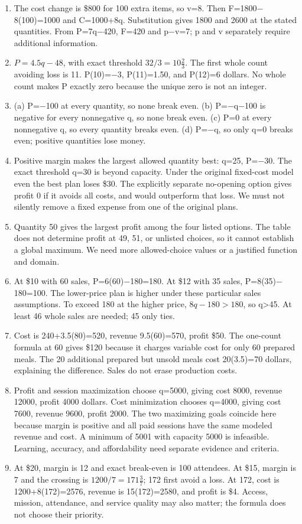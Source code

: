 \documentclass[11pt,letterpaper]{article}
\begin{document}
{\begin{enumerate}
\item The cost change is \$800 for 100 extra items, so v=8. Then F=1800\ensuremath{-}8(100)=1000 and C=1000+8q. Substitution gives 1800 and 2600 at the stated quantities. From P=7q\ensuremath{-}420, F=420 and p\ensuremath{-}v=7; p and v separately require additional information.
\item $P=4.5q-48$, with exact threshold $32/3=10\tfrac23$. The first whole count avoiding loss is 11. P(10)=\ensuremath{-}3, P(11)=1.50, and P(12)=6 dollars. No whole count makes P exactly zero because the unique zero is not an integer.
\newpage
\item (a) P=\ensuremath{-}100 at every quantity, so none break even. (b) P=\ensuremath{-}q\ensuremath{-}100 is negative for every nonnegative q, so none break even. (c) P=0 at every nonnegative q, so every quantity breaks even. (d) P=\ensuremath{-}q, so only q=0 breaks even; positive quantities lose money.
\item Positive margin makes the largest allowed quantity best: q=25, P=\ensuremath{-}30. The exact threshold q=30 is beyond capacity. Under the original fixed-cost model even the best plan loses \$30. The explicitly separate no-opening option gives profit 0 if it avoids all costs, and would outperform that loss. We must not silently remove a fixed expense from one of the original plans.
\item Quantity 50 gives the largest profit among the four listed options. The table does not determine profit at 49, 51, or unlisted choices, so it cannot establish a global maximum. We need more allowed-choice values or a justified function and domain.
\item At \$10 with 60 sales, P=6(60)\ensuremath{-}180=180. At \$12 with 35 sales, P=8(35)\ensuremath{-}180=100. The lower-price plan is higher under these particular sales assumptions. To exceed 180 at the higher price, $8q-180>180$, so q>45. At least 46 whole sales are needed; 45 only ties.
\item Cost is 240+3.5(80)=520, revenue 9.5(60)=570, profit \$50. The one-count formula at 60 gives \$120 because it charges variable cost for only 60 prepared meals. The 20 additional prepared but unsold meals cost 20(3.5)=70 dollars, explaining the difference. Sales do not erase production costs.
\item Profit and session maximization choose q=5000, giving cost 8000, revenue 12000, profit 4000 dollars. Cost minimization chooses q=4000, giving cost 7600, revenue 9600, profit 2000. The two maximizing goals coincide here because margin is positive and all paid sessions have the same modeled revenue and cost. A minimum of 5001 with capacity 5000 is infeasible. Learning, accuracy, and affordability need separate evidence and criteria.
\item At \$20, margin is 12 and exact break-even is 100 attendees. At \$15, margin is 7 and the crossing is $1200/7=171\tfrac37$; 172 first avoid a loss. At 172, cost is 1200+8(172)=2576, revenue is 15(172)=2580, and profit is \$4. Access, mission, attendance, and service quality may also matter; the formula does not choose their priority.
\end{enumerate}
}
\end{document}
